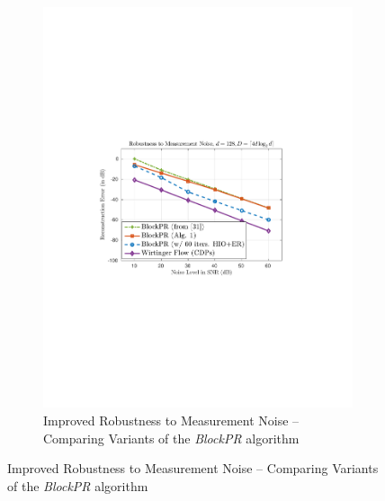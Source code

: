 %
\begin{figure}[hbtp]
\centering
\begin{subfigure}[b]{0.8\textwidth}
\centering
\includegraphics[clip=true, trim = 1.5in 3.5in 1.5in 3.25in, scale=0.80]{pics/fig2a}
\caption{Improved Robustness to Measurement Noise -- Comparing Variants of the {\em BlockPR}
algorithm}
\label{fig:eig_vs_greedy}
\end{subfigure}


\end{figure}
